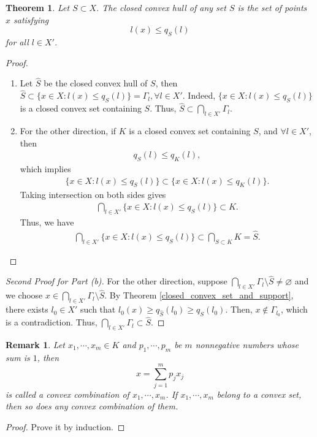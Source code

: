 \documentclass[11pt]{book}
\newtheorem{theorem}{Theorem}[section]
\newtheorem{remark}{Remark}[section]
\theoremstyle{definition}
\numberwithin{equation}{chapter}
\begin{document}
\begin{theorem}
Let $S \subset X$. The closed convex hull of any set $S$ is the set of points $x$ satisfying 
$$l(x) \leq q_S(l)$$ 
for all $l \in X'$.
\end{theorem}
\begin{proof}
~\begin{enumerate}[label=(\alph*)]
    \item Let $\hat{S}$ be the closed convex hull of $S$, then $\hat{S} \subset \{x \in X: l(x) \leq q_S(l)\} = \Gamma_l, \forall l \in X'$. Indeed, $\{x \in X: l(x) \leq q_S(l)\}$ is a closed convex set containing $S$. Thus, $\hat{S} \subset \bigcap_{l \in X'} \Gamma_l$.
    
    \item For the other direction, if $K$ is a closed convex set containing $S$, and $\forall l \in X'$, then 
    \begin{align*}
        q_S(l) \leq q_K(l),
    \end{align*}
    which implies
    \begin{align*}
        \{x \in X: l(x) \leq q_S(l)\} \subset \{x \in X: l(x) \leq q_K(l)\}.
    \end{align*}
    Taking intersection on both sides gives
    \begin{align*}
        \bigcap_{l \in X'} \{x \in X: l(x) \leq q_S(l)\} \subset K.
    \end{align*}
    Thus, we have
    \begin{align*}
        \bigcap_{l \in X'} \{x \in X: l(x) \leq q_S(l)\} \subset \bigcap_{S \subset K} K = \hat{S}.
    \end{align*}
\end{enumerate}
\end{proof}

\begin{proof}[Second Proof for Part (b)] \cite{26}
For the other direction, suppose $\bigcap_{l \in X'} \Gamma_l \setminus \hat{S} \neq \varnothing$ and we choose $x \in \bigcap_{l \in X'} \Gamma_l \setminus \hat{S}$. By Theorem \ref{closed_convex_set_and_support}, there exists $l_0 \in X'$ such that $l_0(x) \geq q_{\hat{S}}(l_0) \geq q_S(l_0)$. Then, $x \notin \Gamma_{l_0}$, which is a contradiction. Thus, $\bigcap_{l \in X'} \Gamma_l \subset \hat{S}$.
\end{proof}

\begin{remark}
Let $x_1, \cdots, x_m \in K$ and $p_1, \cdots, p_m$ be $m$ nonnegative numbers whose sum is $1$, then 
$$x = \sum^m_{j=1} p_j x_j$$ 
is called a convex combination of $x_1, \cdots, x_m$. If $x_1, \cdots, x_m$ belong to a convex set, then so does any convex combination of them.
\end{remark}
\begin{proof}
Prove it by induction.
\end{proof}
\end{document}
